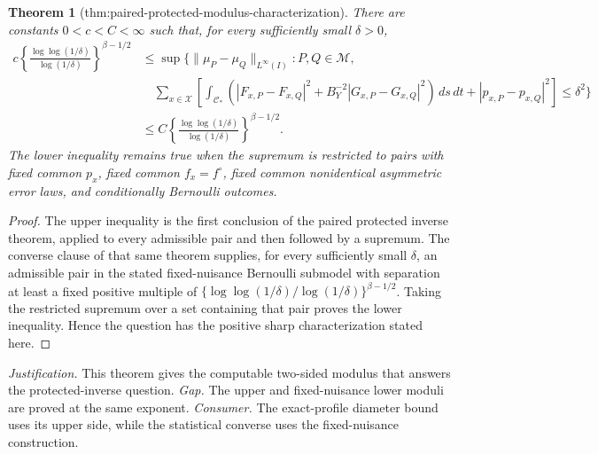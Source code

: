 \documentclass{article}
\newtheorem{theorem}{Theorem}
\begin{document}
\begin{theorem}[thm:paired-protected-modulus-characterization]\label{thm:paired-protected-modulus-characterization}
There are constants \(0<c<C<\infty\) such that, for every sufficiently small \(\delta>0\),
\[
\begin{aligned}
c\left\{\frac{\log\log(1/\delta)}{\log(1/\delta)}\right\}^{\beta-1/2}
&\le
\sup\Bigg\{\|\mu_P-\mu_Q\|_{L^\infty(I)}:P,Q\in\mathcal M,\\
&\quad \sum_{x\in\mathcal X}\left[\int_{\mathcal C_*}
\left(|F_{x,P}-F_{x,Q}|^2+B_Y^{-2}|G_{x,P}-G_{x,Q}|^2\right)\,ds\,dt
+|p_{x,P}-p_{x,Q}|^2\right]\le\delta^2\Bigg\}\\
&\le C\left\{\frac{\log\log(1/\delta)}{\log(1/\delta)}\right\}^{\beta-1/2}.
\end{aligned}
\]
The lower inequality remains true when the supremum is restricted to pairs with fixed common \(p_x\), fixed common \(f_x=f^\circ\), fixed common nonidentical asymmetric error laws, and conditionally Bernoulli outcomes.
\end{theorem}
\begin{proof}
The upper inequality is the first conclusion of the paired protected inverse theorem, applied to every admissible pair and then followed by a supremum.  The converse clause of that same theorem supplies, for every sufficiently small \(\delta\), an admissible pair in the stated fixed-nuisance Bernoulli submodel with separation at least a fixed positive multiple of \(\{\log\log(1/\delta)/\log(1/\delta)\}^{\beta-1/2}\).  Taking the restricted supremum over a set containing that pair proves the lower inequality.  Hence the question has the positive sharp characterization stated here.
\end{proof}
\par\smallskip\noindent \textit{Justification.} This theorem gives the computable two-sided modulus that answers the protected-inverse question. \textit{Gap.} The upper and fixed-nuisance lower moduli are proved at the same exponent. \textit{Consumer.} The exact-profile diameter bound uses its upper side, while the statistical converse uses the fixed-nuisance construction.
\end{document}
